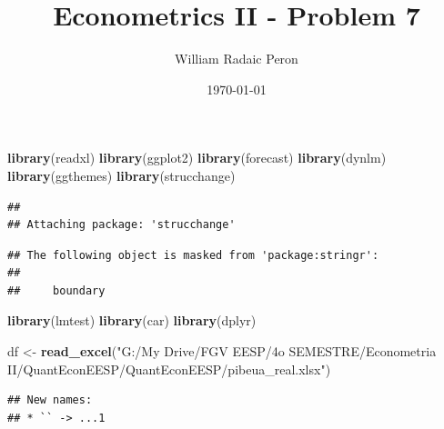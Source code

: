 \documentclass[
]{article}
\title{Econometrics II - Problem 7}
\author{William Radaic Peron}
\date{\today}
\newenvironment{Shaded}{\begin{snugshade}}{\end{snugshade}}
\newcommand{\CommentTok}[1]{\textcolor[rgb]{0.56,0.35,0.01}{\textit{#1}}}
\newcommand{\DataTypeTok}[1]{\textcolor[rgb]{0.13,0.29,0.53}{#1}}
\newcommand{\DecValTok}[1]{\textcolor[rgb]{0.00,0.00,0.81}{#1}}
\newcommand{\KeywordTok}[1]{\textcolor[rgb]{0.13,0.29,0.53}{\textbf{#1}}}
\newcommand{\NormalTok}[1]{#1}
\newcommand{\OperatorTok}[1]{\textcolor[rgb]{0.81,0.36,0.00}{\textbf{#1}}}
\newcommand{\StringTok}[1]{\textcolor[rgb]{0.31,0.60,0.02}{#1}}
\begin{document}
\maketitle

\begin{Shaded}
\begin{Highlighting}[]
\KeywordTok{library}\NormalTok{(readxl)}
\KeywordTok{library}\NormalTok{(ggplot2)}
\KeywordTok{library}\NormalTok{(forecast)}
\KeywordTok{library}\NormalTok{(dynlm)}
\KeywordTok{library}\NormalTok{(ggthemes)}
\KeywordTok{library}\NormalTok{(strucchange)}
\end{Highlighting}
\end{Shaded}

\begin{verbatim}
## 
## Attaching package: 'strucchange'
\end{verbatim}

\begin{verbatim}
## The following object is masked from 'package:stringr':
## 
##     boundary
\end{verbatim}

\begin{Shaded}
\begin{Highlighting}[]
\KeywordTok{library}\NormalTok{(lmtest)}
\KeywordTok{library}\NormalTok{(car)}
\KeywordTok{library}\NormalTok{(dplyr)}

\NormalTok{df <-}\StringTok{ }\KeywordTok{read_excel}\NormalTok{(}\StringTok{"G:/My Drive/FGV EESP/4o SEMESTRE/Econometria II/QuantEconEESP/QuantEconEESP/pibeua_real.xlsx"}\NormalTok{)}
\end{Highlighting}
\end{Shaded}

\begin{verbatim}
## New names:
## * `` -> ...1
\end{verbatim}

\begin{Shaded}
\end{Shaded}
\end{document}

